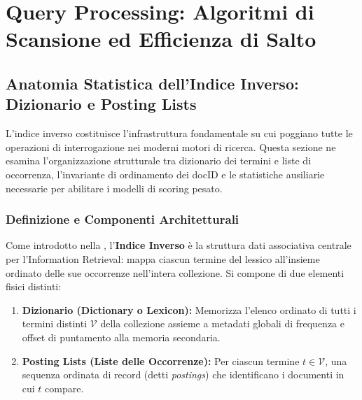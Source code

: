 \chapter{Query Processing: Algoritmi di Scansione ed Efficienza di Salto}
\label{chap:indici-inversi-query-processing}

\FloatBarrier
\section{Anatomia Statistica dell'Indice Inverso: Dizionario e Posting Lists}
\label{sec:modelli-indice-inverso}

L'indice inverso costituisce l'infrastruttura fondamentale su cui poggiano tutte le operazioni di interrogazione nei moderni motori di ricerca. Questa sezione ne esamina l'organizzazione strutturale tra dizionario dei termini e liste di occorrenza, l'invariante di ordinamento dei docID e le statistiche ausiliarie necessarie per abilitare i modelli di scoring pesato.

\FloatBarrier
\subsection{Definizione e Componenti Architetturali}
\label{subsec:definizione-componenti-indice}
Come introdotto nella , l'\textbf{Indice Inverso} \`e la struttura dati associativa centrale per l'Information Retrieval: mappa ciascun termine del lessico all'insieme ordinato delle sue occorrenze nell'intera collezione. Si compone di due elementi fisici distinti:
\begin{enumerate}
    \item \textbf{Dizionario (Dictionary o Lexicon):} Memorizza l'elenco ordinato di tutti i termini distinti $\mathcal{V}$ della collezione assieme a metadati globali di frequenza e offset di puntamento alla memoria secondaria.
    \item \textbf{Posting Lists (Liste delle Occorrenze):} Per ciascun termine $t \in \mathcal{V}$, una sequenza ordinata di record (detti \textit{postings}) che identificano i documenti in cui $t$ compare.
\end{enumerate}

